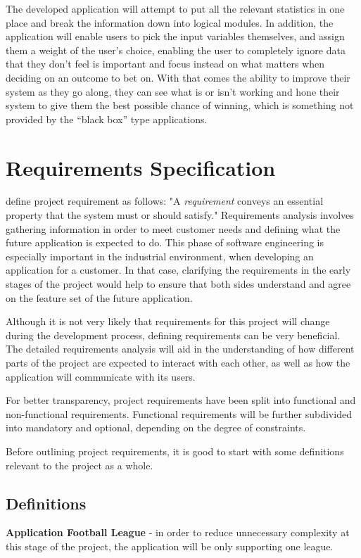 The developed application will attempt to put all the relevant statistics in one place and break the information down into logical modules. In addition, the application will enable users to pick the input variables themselves, and assign them a weight of the user's choice, enabling the user to completely ignore data that they don’t feel is important and focus instead on what matters when deciding on an outcome to bet on. With that comes the ability to improve their system as they go along, they can see what is or isn’t working and hone their system to give them the best possible chance of winning, which is something not provided by the “black box” type applications. 
\section{Requirements Specification}
\label{sec:requirements_req}
\citet{book:radice1998software} define project requirement as follows: "A \emph{requirement} conveys an essential property that the system must or should satisfy." Requirements analysis involves gathering information in order to meet customer needs and defining what the future application is expected to do.
This phase of software engineering is especially important in the industrial environment, when developing an application for a customer. In that case, clarifying the requirements in the early stages of the project would help to ensure that both sides understand and agree on the feature set of the future application.

Although it is not very likely that requirements for this project will change during the development process, defining requirements can be very beneficial. The detailed requirements analysis will aid in the understanding of how different parts of the project are expected to interact with each other, as well as how the application will communicate with its users.

For better transparency, project requirements have been split into functional and non-functional requirements. Functional requirements will be further subdivided into mandatory and optional, depending on the degree of constraints.

Before outlining project requirements, it is good to start with some definitions relevant to the project as a whole.

\subsection{Definitions}
\label{subsec:definitions_req}
\textbf{Application Football League} - in order to reduce unnecessary complexity at this stage of the project, the application will be only supporting one league.

